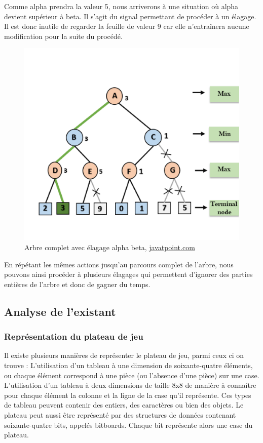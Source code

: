\documentclass{article}
\begin{document}
Comme alpha prendra la valeur 5, nous arriverons à une situation où alpha devient supérieur à beta. Il s'agit du signal permettant de procéder à un élagage. Il est donc inutile de regarder la feuille de valeur 9 car elle n'entraînera aucune modification pour la suite du procédé.

\begin{figure}[!h]
\centering
\includegraphics[scale=0.8]{img/alpha-beta-pruning-step8.png}
\caption{Arbre complet avec élagage alpha beta,
\href{https://www.javatpoint.com/ai-alpha-beta-pruning}{javatpoint.com}}
\end{figure}

En répétant les mêmes actions jusqu'au parcours complet de l'arbre, nous pouvons ainsi procéder à plusieurs élagages qui permettent d'ignorer des parties entières de l'arbre et donc de gagner du temps.

\subsection{Analyse de l'existant}
\subsubsection{Représentation du plateau de jeu}
Il existe plusieurs manières de représenter le plateau de jeu, parmi ceux ci on trouve :
L'utilisation d'un tableau à une dimension de soixante-quatre éléments, ou chaque élément correspond à une pièce (ou l'absence d'une pièce) sur une case.\newline 
L'utilisation d'un tableau à deux dimensions de taille 8x8 de manière à connaître pour chaque élément la colonne et la ligne de la case qu'il représente.\newline
Ces types de tableau peuvent contenir des entiers, des caractères ou bien des objets.\newline
Le plateau peut aussi être représenté par des structures de données contenant soixante-quatre bits, appelés bitboards. Chaque bit représente alors une case du plateau.
\end{document}
